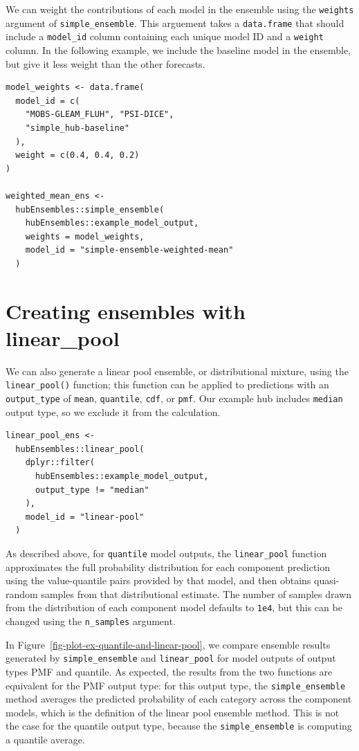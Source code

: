 \documentclass[
  article,
  shortnames,
  notitle]{jss}
\begin{document}
We can weight the contributions of each model in the ensemble using the
\texttt{weights} argument of \texttt{simple\_ensemble}. This arguement
takes a \texttt{data.frame} that should include a \texttt{model\_id}
column containing each unique model ID and a \texttt{weight} column. In
the following example, we include the baseline model in the ensemble,
but give it less weight than the other forecasts.

\begin{verbatim}
model_weights <- data.frame(
  model_id = c(
    "MOBS-GLEAM_FLUH", "PSI-DICE",
    "simple_hub-baseline"
  ),
  weight = c(0.4, 0.4, 0.2)
)

weighted_mean_ens <-
  hubEnsembles::simple_ensemble(
    hubEnsembles::example_model_output,
    weights = model_weights,
    model_id = "simple-ensemble-weighted-mean"
  )
\end{verbatim}

\section{Creating ensembles with
linear\_pool}\label{creating-ensembles-with-linear_pool}

We can also generate a linear pool ensemble, or distributional mixture,
using the \texttt{linear\_pool()} function; this function can be applied
to predictions with an \texttt{output\_type} of \texttt{mean},
\texttt{quantile}, \texttt{cdf}, or \texttt{pmf}. Our example hub
includes \texttt{median} output type, so we exclude it from the
calculation.

\begin{verbatim}
linear_pool_ens <-
  hubEnsembles::linear_pool(
    dplyr::filter(
      hubEnsembles::example_model_output,
      output_type != "median"
    ),
    model_id = "linear-pool"
  )
\end{verbatim}

As described above, for \texttt{quantile} model outputs, the
\texttt{linear\_pool} function approximates the full probability
distribution for each component prediction using the value-quantile
pairs provided by that model, and then obtains quasi-random samples from
that distributional estimate. The number of samples drawn from the
distribution of each component model defaults to \texttt{1e4}, but this
can be changed using the \texttt{n\_samples} argument.

In Figure~\ref{fig-plot-ex-quantile-and-linear-pool}, we compare
ensemble results generated by \texttt{simple\_ensemble} and
\texttt{linear\_pool} for model outputs of output types PMF and
quantile. As expected, the results from the two functions are equivalent
for the PMF output type: for this output type, the
\texttt{simple\_ensemble} method averages the predicted probability of
each category across the component models, which is the definition of
the linear pool ensemble method. This is not the case for the quantile
output type, because the \texttt{simple\_ensemble} is computing a
quantile average.
\end{document}
